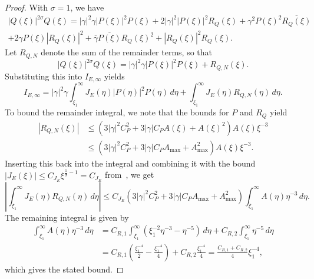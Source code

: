 \documentclass[11pt]{article}
\newcommand{\conj}[1]{\overline{#1}}
\begin{document}
\begin{proof}
  With \(\sigma = 1\), we have
  \begin{multline*}
    |Q(\xi)|^{2\sigma}Q(\xi)
    = |\gamma|^{2}\gamma|P(\xi)|^{2}P(\xi)
    + 2|\gamma|^{2}|P(\xi)|^{2} R_{Q}(\xi)
    + \gamma^{2}P(\xi)^{2}\conj{R_{Q}(\xi)}\\
    + 2\gamma P(\xi) |R_{Q}(\xi)|^{2}
    + \conj{\gamma}\conj{P(\xi)} R_{Q}(\xi)^{2}
    + |R_{Q}(\xi)|^{2} R_{Q}(\xi).
  \end{multline*}
  Let \(R_{Q,N}\) denote the sum of the remainder terms, so that
  \begin{equation*}
    |Q(\xi)|^{2\sigma}Q(\xi) = |\gamma|^{2}\gamma|P(\xi)|^{2}P(\xi)
    + R_{Q,N}(\xi).
  \end{equation*}
  Substituting this into \(I_{E,\infty}\) yields
  \begin{equation*}
    I_{E,\infty}
    = |\gamma|^{2}\gamma\int_{\xi_{1}}^{\infty} J_{E}(\eta)|P(\eta)|^{2}P(\eta)\,d\eta
    + \int_{\xi_{1}}^{\infty} J_{E}(\eta)R_{Q,N}(\eta)\,d\eta.
  \end{equation*}
  To bound the remainder integral, we note that the bounds for \(P\)
  and \(R_{Q}\) yield
  \begin{equation*}
    \begin{split}
      |R_{Q,N}(\xi)|
      &\leq \left(3|\gamma|^{2}C_{P}^{2} + 3|\gamma|C_{P}A(\xi) + A(\xi)^{2}\right)A(\xi)\xi^{-3}\\
      &\leq \left(3|\gamma|^{2}C_{P}^{2} + 3|\gamma|C_{P}A_{\max} + A_{\max}^{2}\right)A(\xi)\xi^{-3}.
    \end{split}
  \end{equation*}
  Inserting this back into the integral and combining it with the bound
  \(|J_{E}(\xi)| \leq C_{J_{E}}\xi^{\frac{1}{\sigma} - 1} = C_{J_{E}}\)
  from~\cite[Lemma~7.3]{Dahne2024}, we get
  \begin{equation*}
    \left|\int_{\xi_{1}}^{\infty} J_{E}(\eta)R_{Q,N}(\eta)\,d\eta\right|
    \leq C_{J_{E}}\left(3|\gamma|^{2}C_{P}^{2} + 3|\gamma|C_{P}A_{\max} + A_{\max}^{2}\right)
    \int_{\xi_{1}}^{\infty} A(\eta)\eta^{-3}\,d\eta.
  \end{equation*}
  The remaining integral is given by
  \begin{equation*}
    \begin{split}
      \int_{\xi_{1}}^{\infty} A(\eta)\eta^{-3}\,d\eta
      &= C_{R,1}\int_{\xi_{1}}^{\infty}\left(\xi_{1}^{-2}\eta^{-3} - \eta^{-5}\right)\,d\eta
        + C_{R,2}\int_{\xi_{1}}^{\infty}\eta^{-5}\,d\eta\\
      &= C_{R,1}\left(\frac{\xi_{1}^{-4}}{2} - \frac{\xi_{1}^{-4}}{4}\right)
        + C_{R,2}\frac{\xi_{1}^{-4}}{4}
      = \frac{C_{R,1} + C_{R,2}}{4}\xi_{1}^{-4},
    \end{split}
  \end{equation*}
  which gives the stated bound.
\end{proof}
\end{document}
